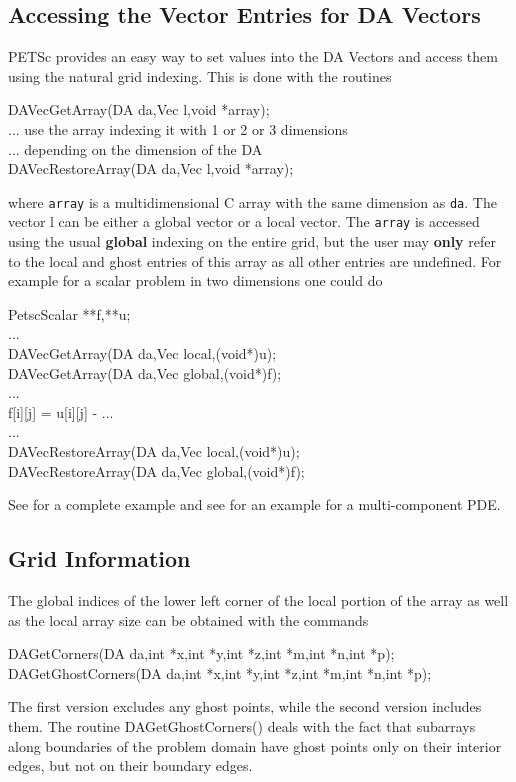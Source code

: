 \subsection{Accessing the Vector Entries for DA Vectors}
PETSc provides an easy way to set values into the DA Vectors and access them using
the natural grid indexing. This is done with the routines 
\begin{tabbing}
  DAVecGetArray(DA da,Vec l,void *array);\\
   ... use the array indexing it with 1 or 2 or 3 dimensions \\
   ... depending on the dimension of the DA\\
  DAVecRestoreArray(DA da,Vec l,void *array);
\end{tabbing}
where {\tt array} is a multidimensional C array with the same dimension as
{\tt da}. The vector l can be either a global vector or a local vector.
The {\tt array} is accessed using the usual {\bf global} indexing
on the entire grid, but the user may {\bf only} refer to the local and ghost
entries of this array as all other entries are undefined. For example for a
scalar problem in two dimensions one could do
\begin{tabbing}
   PetscScalar **f,**u;\\
   ...\\
  DAVecGetArray(DA da,Vec local,(void*)u);\\
  DAVecGetArray(DA da,Vec global,(void*)f);\\
   ...\\
      f[i][j] = u[i][j] - ...\\
   ...\\
  DAVecRestoreArray(DA da,Vec local,(void*)u);\\
  DAVecRestoreArray(DA da,Vec global,(void*)f);
\end{tabbing}
See  for a 
complete example and see  for an
example for a multi-component PDE.

\subsection{Grid Information}

The global indices of the lower left corner of the local portion of the array 
as well as the local array size can be obtained with the commands
 
\begin{tabbing}
  DAGetCorners(DA da,int *x,int *y,int *z,int *m,int *n,int *p);\\
  DAGetGhostCorners(DA da,int *x,int *y,int *z,int *m,int *n,int *p);
\end{tabbing}
The first version excludes any ghost points, while the second version
includes them. 
The routine  DAGetGhostCorners()
deals with the fact that subarrays along boundaries of the problem
domain have ghost points only on their interior edges, but not on
their boundary edges.

